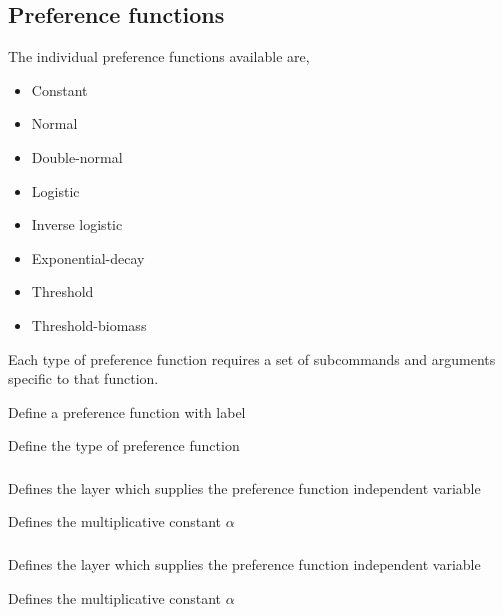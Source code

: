 \subsection{Preference functions}

The individual preference functions available are, 

\begin{itemize}
	\item Constant
	\item Normal
	\item Double-normal
	\item Logistic
	\item Inverse logistic
	\item Exponential-decay
	\item Threshold
	\item Threshold-biomass	
\end{itemize}

Each type of preference function requires a set of subcommands and arguments specific to that function.

 {Define a preference function with label}

 {Define the type of preference function}

\subsubsection[Constant]{}

 {Defines the layer which supplies the preference function independent variable}

 {Defines the multiplicative constant $\alpha$}

\subsubsection[Normal]{}

 {Defines the layer which supplies the preference function independent variable}

 {Defines the multiplicative constant $\alpha$}


